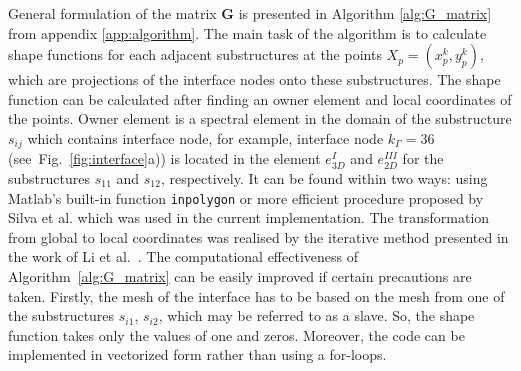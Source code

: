 \documentclass[sensors,article,submit,moreauthors,pdftex]{Definitions/mdpi}
\begin{document}
General formulation of the matrix \textbf{G} is presented in Algorithm \ref{alg:G_matrix} from appendix \ref{app:algorithm}.
The main task of the algorithm is to calculate shape functions for each adjacent substructures at the points \(X_p=(x_p^k,y_p^k)\), which are projections of the interface nodes onto these substructures.
The shape function can be calculated after finding an owner element and local coordinates of the points.
Owner element is a spectral element in the domain of the substructure \(s_{ij}\) which contains interface node, for example, interface node \(k_\Gamma=36\) (see~Fig.~\ref{fig:interface}a)) is located in the element \(e^{I}_{3D}\) and \(e^{III}_{2D}\) for the substructures \(s_{11}\) and \(s_{12}\), respectively.
It can be found within two ways: using Matlab's built-in function \verb+inpolygon+ or more efficient procedure proposed by Silva et al. \cite{silva2009exact} which was used in the current implementation.
The transformation from global to local coordinates was realised by the iterative method presented in the work of Li et al.~\cite{li2014efficient}.
The computational effectiveness of Algorithm~\ref{alg:G_matrix} can be easily improved if certain precautions are taken.
Firstly, the mesh of the interface has to be based on the mesh from one of the substructures \(s_{i1}\), \(s_{i2}\), which may be referred to as a slave.
So, the shape function takes only the values of one and zeros.
Moreover, the code can be implemented in vectorized form rather than using a for-loops.
\end{document}
